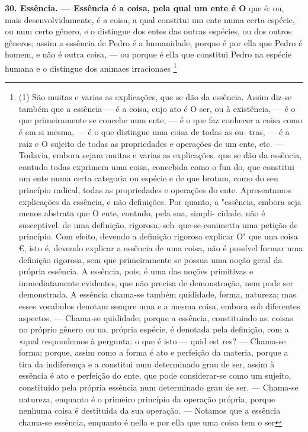 \documentclass[12pt,a4paper]{article}
\newcommand{\pagmark}[1]{\quad[\textit{p.\,#1}]\quad}
\begin{document}
{\medskip\noindent\textbf{30. Essência. — Essência é a coisa, pela qual um ente é O}
que é: ou, mais desenvolvidamente, é a coisa, a qual constitui um
\pagmark{303}
ente numa certa espécie, ou num certo gênero, e o distingue dos
 entes das outras espécies, ou dos outros gêneros; assim a essência
 de Pedro é a humanidade, porque é por ella que Pedro é homem,
 e não é outra coisa, — ou porque é ella  que constitui Pedro
 na espécie humana e o distingue dos animaes irracionaes \footnote{(1) São muitas e varias as explicações, que se dão da essência. Assim
 diz-se também que a essência
 — é a coisa, cujo ato é O ser, ou à existência,
 — é o que primeiramente se concebe num ente, — é o que faz conhecer
 a
 coisa como é em si mesma, — é o que distingue uma coisa de todas as ou-
 tras, — é a raiz e O sujeito de todas as propriedades e operações de um
 ente, etc. — Todavia, embora sejam muitas e varias as explicações. que se
 dão da essência, contudo todas exprimem uma coisa, concebida como o fun
 do, que constitui um ente numa certa categoria ou espécie e de que brotam,
 como do seu princípio radical, todas as propriedades e operações do
 ente.
 Apresentamos explicações da essência, e não definições. Por quanto, a
"essência, embora seja menos abstrata que O ente, contudo, pela sua, simpli-
 cidade, não é susceptivel. de uma definição. rigorosa,-seh--que-se-conimetta
uma petição de princípio. Com efeito, devendo a definição rigorosa explicar
O" que una coisa €, isto é, devendo explicar a essência de uma coisa, não é
possível formar uma definição rigorosa, sem que primeiramente se possua
 uma noção geral da própria essência. A essência, pois, é uma das noções
primitivas e immediatamente evidentes, que não precisa de demonstração,
nem pode ser demonstrada.
 A essência chama-se também quididade, forma, natureza; mas esses
vocabulos denotam sempre uma e a mesma coisa, embora sob diferentes
aspectos. — Chama-se quididade; porque a essência, constituindo as. coisas
no próprio gênero ou na. própria espécie, é denotada pela definição, com a
«qual respondemos à pergunta: o que é isto — quid est res? — Chama-se
forma; porque, assim como a forma é ato e perfeição da materia, porque
 a
tira da indiferença e a constitui num determinado grau de ser, assim à
essência é ato e perfeição do ente, que pode considerar-se como um sujeito, constituido pela própria essência num determinado grau de ser. —
 Chama-se natureza, enquanto é o primeiro princípio da operação própria, porque nenhuma coisa é destituida da sua operação. — Notamos que a essência
chama-se essência, enquanto é nella e por ella que uma coisa tem o ser
}}
\end{document}
